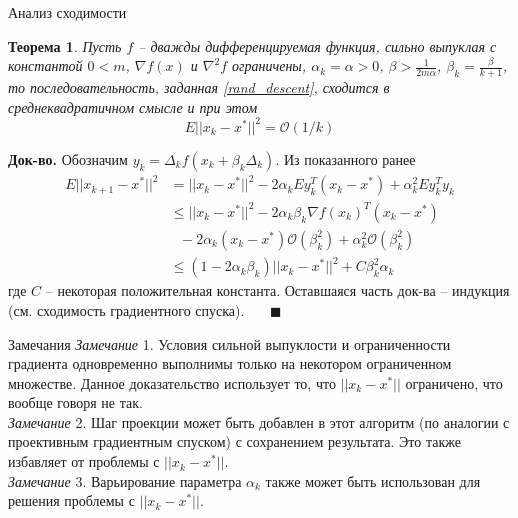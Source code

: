 \documentclass[10pt, handout]{beamer}
\newcounter{thm}
\newtheorem{theorem_ru}[thm]{Теорема}
\begin{document}
\begin{frame}{Анализ сходимости}
\begin{theorem_ru}
Пусть $f$ -- дважды дифференцируемая функция, сильно выпуклая с константой $0<m$, $\nabla f(x)$ и $\nabla^2 f$ ограничены, $\alpha_k=\alpha>0$,
$\beta>\frac{1}{2m\alpha}$, $\beta_k=\frac{\beta}{k+1}$, то последовательность, заданная \eqref{rand_descent}, сходится в среднеквадратичном смысле и при этом
$$
E||x_k-x^*||^2=\mathcal{O}(1/k)
$$
\end{theorem_ru}
\pause
\textbf{Док-во.} Обозначим $y_k=\Delta_k f(x_k+\beta_k \Delta_k)$. Из показанного ранее
\begin{align*}
E||x_{k+1}-x^*||^2&=||x_k-x^*||^2-2\alpha_kEy_k^T(x_k-x^*)+\alpha_k^2Ey_k^Ty_k\\
&\leq ||x_k-x^*||^2-2\alpha_k\beta_k\nabla f(x_k)^T(x_k-x^*)\\
&~~~-2\alpha_k(x_k-x^*)\mathcal{O}(\beta_k^2)+\alpha_k^2\mathcal{O}(\beta_k^2)\\
&\leq (1-2\alpha_k\beta_k)||x_k-x^*||^2 + C\beta_k^2\alpha_k
\end{align*}
где $C$ -- некоторая положительная константа. Оставшаяся часть док-ва -- индукция (см. сходимость градиентного спуска).~~~ $\blacksquare$
\end{frame}

\begin{frame}{Замечания}
\textit{Замечание} 1. Условия сильной выпуклости и ограниченности градиента одновременно выполнимы только на некотором ограниченном множестве. Данное доказательство
использует то, что $||x_k-x^*||$ ограничено, что вообще говоря не так.\\
\vspace{1em}
\pause
\textit{Замечание} 2. Шаг проекции может быть добавлен в этот алгоритм (по аналогии с проективным градиентным спуском) с сохранением результата. Это
также избавляет от проблемы с $||x_k-x^*||$.\\
\vspace{1em}
\pause
\textit{Замечание} 3. Варьирование параметра $\alpha_k$ также может быть использован для решения проблемы с $||x_k-x^*||$.
\end{frame}
\end{document}
